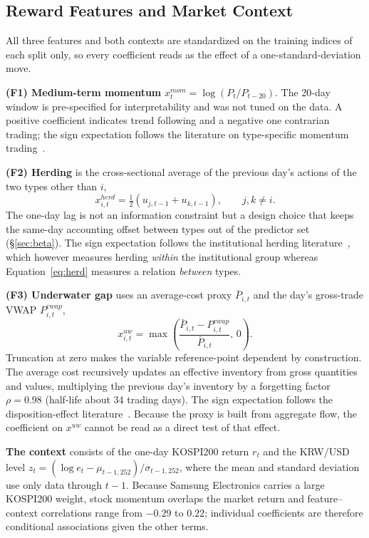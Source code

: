 \subsection{Reward Features and Market Context}
\label{sec:features}

All three features and both contexts are standardized on the training indices of
each split only, so every coefficient reads as the effect of a
one-standard-deviation move.

\textbf{(F1) Medium-term momentum} $x^{mom}_{t}=\log(P_t/P_{t-20})$. The 20-day
window is pre-specified for interpretability and was not tuned on the data. A
positive coefficient indicates trend following and a negative one contrarian
trading; the sign expectation follows the literature on type-specific momentum
trading~\cite{grinblatt2000investment,choe1999foreign}.

\textbf{(F2) Herding} is the cross-sectional average of the previous day's
actions of the two types other than $i$,
\begin{equation}
x^{herd}_{i,t}=\tfrac{1}{2}\left(u_{j,t-1}+u_{k,t-1}\right),\qquad j,k\neq i.
\label{eq:herd}
\end{equation}
The one-day lag is not an information constraint but a design choice that keeps
the same-day accounting offset between types out of the predictor set
(\S\ref{sec:beta}). The sign expectation follows the institutional herding
literature~\cite{lakonishok1992impact}, which however measures herding
\emph{within} the institutional group whereas Equation~\eqref{eq:herd} measures
a relation \emph{between} types.

\textbf{(F3) Underwater gap} uses an average-cost proxy $\bar P_{i,t}$ and the
day's gross-trade VWAP $P^{vwap}_{i,t}$,
\begin{equation}
x^{uw}_{i,t}=\max\!\left(
\frac{\bar P_{i,t}-P^{vwap}_{i,t}}{\bar P_{i,t}},\,0\right).
\label{eq:underwater}
\end{equation}
Truncation at zero makes the variable reference-point dependent by construction.
The average cost recursively updates an effective inventory from gross
quantities and values, multiplying the previous day's inventory by a forgetting
factor $\rho=0.98$ (half-life about 34 trading days). The sign expectation
follows the disposition-effect
literature~\cite{shefrin1985disposition,odean1998investors}. Because the proxy is
built from aggregate flow, the coefficient on $x^{uw}$ cannot be read as a direct
test of that effect.

\textbf{The context} consists of the one-day KOSPI200 return $r_t$ and the
KRW/USD level $z_t=(\log e_t-\mu_{t-1,252})/\sigma_{t-1,252}$, where the mean and
standard deviation use only data through $t-1$. Because Samsung Electronics
carries a large KOSPI200 weight, stock momentum overlaps the market return and
feature--context correlations range from $-0.29$ to $0.22$; individual
coefficients are therefore conditional associations given the other terms.

